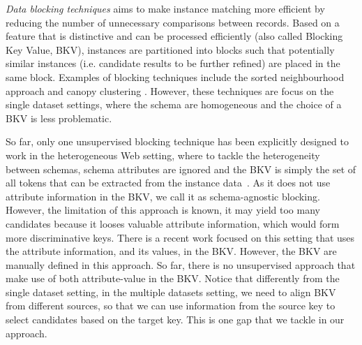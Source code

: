 \emph{Data blocking techniques} \cite{hernandez_merge/purge_1995} aims to make instance matching more efficient by reducing the number of unnecessary comparisons between records. Based on a feature that is distinctive and can be processed efficiently (also called Blocking Key Value, BKV), instances are partitioned into blocks such that potentially similar instances (i.e. candidate results to be further refined) are placed in the same block. Examples of blocking techniques include the sorted neighbourhood approach and canopy clustering \cite{mccallum_efficient_2000}. However, these techniques are focus on the single dataset settings, where the schema are homogeneous and the choice of a BKV is less problematic. 

So far, only one unsupervised blocking technique has been explicitly designed to work in the heterogeneous Web setting, where to tackle the heterogeneity between schemas, schema attributes are ignored and the BKV is simply the set of all tokens that can be extracted from the instance data~\cite{papadakis_efficient_2011}. As it does not use attribute information in the BKV, we call it as schema-agnostic blocking. However, the limitation of this approach is known, it may yield too many candidates because it looses valuable attribute information, which would form more discriminative keys. There is a recent work \cite{DBLP:conf/semweb/SongH11} focused on this setting that uses the attribute information, and its values, in the BKV. However, the BKV are manually defined in this approach. So far, there is no unsupervised approach that make use of both attribute-value in the BKV. Notice that differently from the single dataset setting, in the multiple datasets setting, we need to align BKV from different sources, so that we can use information from the source key to select candidates based on the target key. This is one gap that we tackle in our approach. 


